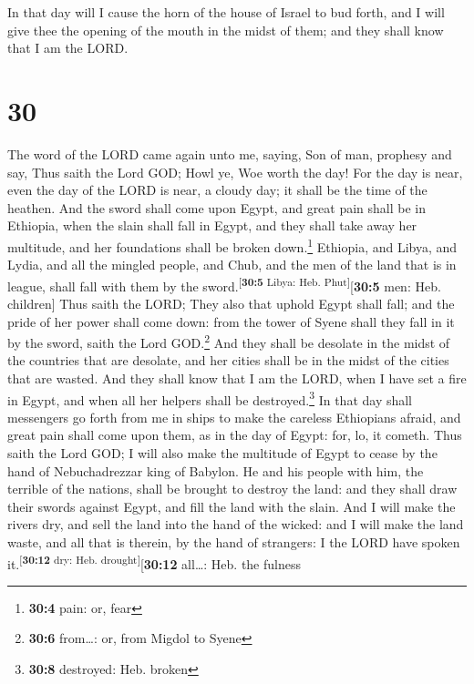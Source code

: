  In that day will I cause the horn of the house of Israel
to bud forth, and I will give thee the opening of the mouth in the midst
of them; and they shall know that I am the LORD.

\hypertarget{section-29}{%
\section{30}\label{section-29}}

 The word of the LORD came again unto me, saying,
 Son of man, prophesy and say, Thus saith the Lord GOD;
Howl ye, Woe worth the day!  For the day is near, even the
day of the LORD is near, a cloudy day; it shall be the time of the
heathen.  And the sword shall come upon Egypt, and great
pain shall be in Ethiopia, when the slain shall fall in Egypt, and they
shall take away her multitude, and her foundations shall be broken
down.\footnote{\textbf{30:4} pain: or, fear}  Ethiopia,
and Libya, and Lydia, and all the mingled people, and Chub, and the men
of the land that is in league, shall fall with them by the
sword.\textsuperscript{{[}\textbf{30:5} Libya: Heb.
Phut{]}}{[}\textbf{30:5} men: Heb. children{]}  Thus saith
the LORD; They also that uphold Egypt shall fall; and the pride of her
power shall come down: from the tower of Syene shall they fall in it by
the sword, saith the Lord GOD.\footnote{\textbf{30:6} from\ldots: or,
  from Migdol to Syene}  And they shall be desolate in the
midst of the countries that are desolate, and her cities shall be in the
midst of the cities that are wasted.  And they shall know
that I am the LORD, when I have set a fire in Egypt, and when all her
helpers shall be destroyed.\footnote{\textbf{30:8} destroyed: Heb.
  broken}  In that day shall messengers go forth from me
in ships to make the careless Ethiopians afraid, and great pain shall
come upon them, as in the day of Egypt: for, lo, it cometh.
 Thus saith the Lord GOD; I will also make the multitude
of Egypt to cease by the hand of Nebuchadrezzar king of Babylon.
 He and his people with him, the terrible of the nations,
shall be brought to destroy the land: and they shall draw their swords
against Egypt, and fill the land with the slain.  And I
will make the rivers dry, and sell the land into the hand of the wicked:
and I will make the land waste, and all that is therein, by the hand of
strangers: I the LORD have spoken it.\textsuperscript{{[}\textbf{30:12}
dry: Heb. drought{]}}{[}\textbf{30:12} all\ldots: Heb. the fulness
